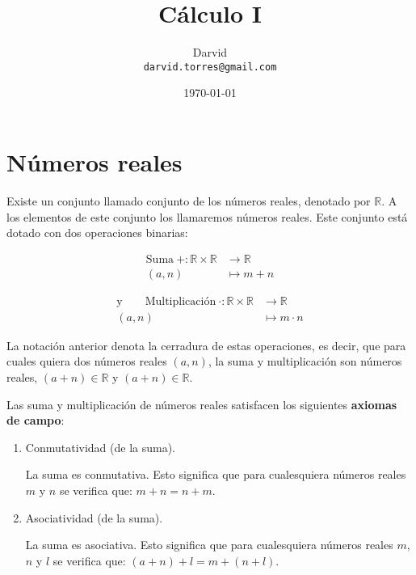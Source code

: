 \documentclass[11pt]{article}
\newcommand{\R}{\mathbb{R}}
\begin{document}
\title{\vspace{-2cm}Cálculo I}
\author{Darvid \\ \texttt{darvid.torres@gmail.com}}
\date{\today}
\maketitle
\thispagestyle{empty}

\section*{Números reales}

Existe un conjunto llamado conjunto de los números reales, denotado por $\R$. A los elementos de este conjunto los llamaremos números reales. Este conjunto está dotado con dos operaciones binarias:\vspace{-0.5cm}
\begin{center}
\noindent\begin{minipage}[r]{5.5cm}
\begin{align*}
    \text{Suma} \ + : \R \times \R &\to \R\\
    (a,n) &\mapsto m+n
\end{align*}
\end{minipage}%
\begin{minipage}[l]{6.5cm}
\begin{align*}
    \text{y} \qquad \text{Multiplicación} \ \cdot : \R \times \R &\to \R\\
    (a,n) &\mapsto m \cdot n
\end{align*}
\end{minipage}
\end{center}

La notación anterior denota la cerradura de estas operaciones, es decir, que para cuales quiera dos números reales $(a,n)$, la suma y multiplicación son números reales, $(a+n)\in \R$ y $(a+n)\in \R$.

Las suma y multiplicación de números reales satisfacen los siguientes \textbf{axiomas de campo}:

\begin{enumerate}[label=S\arabic*.]
    \item Conmutatividad (de la suma).
    
    La suma es conmutativa. Esto significa que para cualesquiera números reales $m$ y $n$ se verifica que: $ m+n = n+m $.
    \item Asociatividad (de la suma).
    
    La suma es asociativa. Esto significa que para cualesquiera números reales $m$, $n$ y $l$ se verifica que: $(a+ n)+l = m+(n+ l)$.
\end{enumerate}
\end{document}
